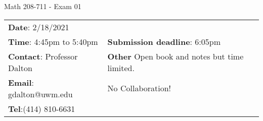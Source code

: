 \documentclass[12pt,letterpaper]{article}
\author{Gary Dalton <gdalton@uwm.edu>}
\begin{document}
	
\begin{center} \LARGE Math 208-711 - Exam 01\end{center}%
\smallskip

\begin{center} \begin{tabular}{l l}
		\textbf{Date}: 2/18/2021 & \\
		\textbf{Time}: 4:45pm to 5:40pm &
		\textbf{Submission deadline}: 6:05pm\\
		\textbf{Contact}: Professor Dalton
		& \textbf{Other} Open book and notes but time limited. \\
		\textbf{Email}: gdalton@uwm.edu 
		& \qquad No Collaboration! \\
		\textbf{Tel}:(414) 810-6631
\end{tabular} \end{center}%
\end{document}
